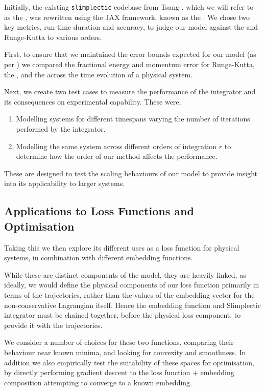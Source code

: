 Initially, the existing \texttt{slimplectic} codebase from Tsang \etall \cite{originalCode}, which we will refer to as the \orgimpl{}, was rewritten using the JAX framework, known as the \updimpl{}. We chose two key metrics, run-time duration and accuracy, to judge our model against the \orgimpl{} and Runge-Kutta to various orders.

First, to ensure that we maintained the error bounds expected for our model (as per ) we compared the fractional energy and momentum error for Runge-Kutta, the \orgimpl{}, and the \updimpl{} across the time evolution of a physical system.

Next, we create two test cases to measure the performance of the integrator and its consequences on experimental capability. These were,

\begin{enumerate}
	\item Modelling systems for different timespans varying the number of iterations performed by the integrator.
	\item Modelling the same system across different orders of integration $r$ to determine how the order of our method affects the performance.
\end{enumerate}

These are designed to test the scaling behaviours of our model to provide insight into its applicability to larger systems.

\subsection{Applications to Loss Functions and Optimisation}

Taking this \updimpl{} we then explore its different uses as a loss function for physical systems, in combination with different embedding functions.

While these are distinct components of the model, they are heavily linked, as ideally, we would define the physical components of our loss function primarily in terms of the trajectories, rather than the values of the embedding vector for the non-conservative Lagrangian itself.
Hence the embedding function and Slimplectic integrator must be chained together, before the physical loss component, to provide it with the trajectories.

We consider a number of choices for these two functions, comparing their behaviour near known minima, and looking for convexity and smoothness. In addition we also empirically test the suitability of these spaces for optimisation, by directly performing gradient descent to the loss function + embedding composition attempting to converge to a known embedding.

